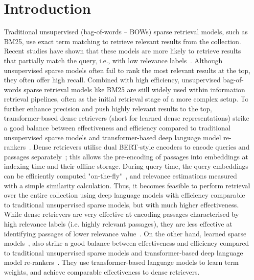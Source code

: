 \section{Introduction}
\label{intro}

Traditional unsupervised (bag-of-words -- BOWs) sparse retrieval models, such as BM25, use exact term matching to retrieve relevant results from the collection. Recent studies have shown that these models are more likely to retrieve results that partially match the query, i.e., with low relevance labels~\cite{wang2021bert}. Although unsupervised sparse models often fail to rank the most relevant results at the top, they often offer high recall. Combined with high efficiency, unsupervised bag-of-words sparse retrieval models like BM25 are still widely used within information retrieval pipelines, often as the initial retrieval stage of a more complex setup. 
To further enhance precision and push highly relevant results to the top, transformer-based dense retrievers (short for learned dense representations) strike a good balance between effectiveness and efficiency compared to traditional unsupervised sparse models and transformer-based deep language model re-rankers~\cite{xiong2020approximate,zhan2020repbert,lin2020distilling,lin2021batch,hofstatter2021efficiently,qu2021rocketqa,ren2021rocketqav2}.
Dense retrievers utilise dual BERT-style encoders to encode queries and passages separately~\cite{lin2020pretrained}; this allows the pre-encoding of passages into embeddings at indexing time and their offline storage. During query time, the query embeddings can be efficiently computed "on-the-fly"~\cite{zhuang2021tilde}, and relevance estimations measured with a simple similarity calculation. Thus, it becomes feasible to perform retrieval over the entire collection using deep language models with efficiency comparable to traditional unsupervised sparse models, but with much higher effectiveness. While dense retrievers are very effective at encoding passages characterised by high relevance labels (i.e. highly relevant passages), they are less effective at identifying passages of lower relevance value~\cite{wang2021bert}. On the other hand, learned sparse models~\cite{dai2019context,lin2021few,nogueira2019doc2query,mallia2021learning,formal2021splade,formal2021spladev1,dai2020context,bai2020sparterm,zhuang2021fast}, also strike a good balance between effectiveness and efficiency compared to traditional unsupervised sparse models and transformer-based deep language model re-rankers~\cite{nogueira2019passage}. They use transformer-based language models to learn term weights, and achieve comparable effectiveness to dense retrievers.

